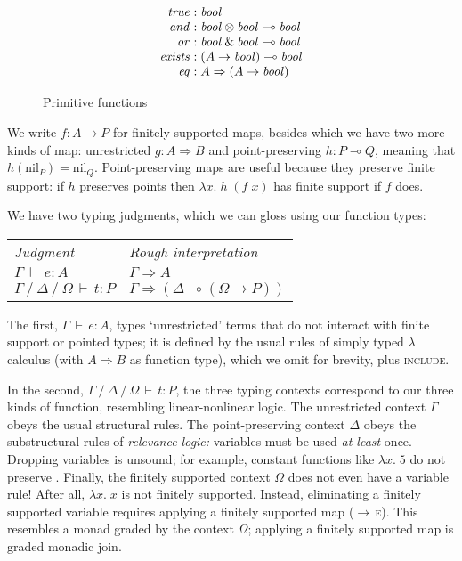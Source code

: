 \documentclass[sigplan,screen,dvipsnames,fleqn]{acmart}
\newcommand\name[1]{\ensuremath{\mathit{#1}}}
\newcommand\fnspace{\;}
\newcommand\fn[1]{\lambda{#1}.\fnspace}
\newcommand\<\;                 %
\newcommand\cto{\Rightarrow}    %
\newcommand\lto\multimap        %
\newcommand\fto{\rightarrow}    %
\newcommand\with{\mathbin{\&}}
\newcommand\ox\otimes
\newcommand\tbool{\name{bool}}
\newcommand\G\Gamma
\newcommand\D\Delta
\renewcommand\O\Omega
\newcommand\cxsep{\mathbin{/}}
\newcommand\cJ[3]{{#3} \,\vdash\, {#1} : {#2}}
\newcommand\J[5]{{#3} \cxsep {#4} \cxsep {#5} \,\vdash\, {#1} : {#2}}
\newcommand\cname\text          %
\newcommand\cnil{\cname{nil}}
\newcommand\tnil\cnil
\begin{document}
\begin{figure}
  \[\begin{array}{r@{\hskip 0.3em}l}
    \name{true} &: \tbool\\
    \name{and} &: \tbool \ox \tbool \lto \tbool\\
    \name{or} &: \tbool \with \tbool \lto \tbool\\
    \name{exists} &: (A \fto \tbool) \lto \tbool\\
    \name{eq} &: A \cto (A \fto \tbool)
  \end{array}\]\vspace{-1\baselineskip}
  \caption{Primitive functions}
  \label{fig-primitives}
\end{figure}

We write $f : A \fto P$ for finitely supported maps, besides which we have two more kinds of map: unrestricted $g : A \cto B$ and point-preserving $h : P \lto Q$, meaning that $h(\tnil_P) = \tnil_Q$.
%
Point-preserving maps are useful because they preserve finite support: if $h$ preserves points then $\fn x h \<(f \<x)$ has finite support if $f$ does.

We have two typing judgments, which we can gloss using our function types:

\begin{center}
  \begin{tabular}{l@{\hskip 2em}l}
    \em Judgment & \em Rough interpretation
    \\
    $\cJ e A \G$ & $\G \cto A$
    \\
    $\J t P \G \D \O$ & $\G \cto (\D \lto (\O \fto P))$
  \end{tabular}
\end{center}

\noindent
The first, $\cJ e A \G$, types `unrestricted' terms that do not interact with finite support or pointed types; it is defined by the usual rules of simply typed $\lambda$ calculus (with $A \cto B$ as function type), which we omit for brevity, plus \textsc{include}.

In the second, $\J t P \G \D \O$, the three typing contexts correspond to our three kinds of function, resembling linear-nonlinear logic.
%
The unrestricted context $\G$ obeys the usual structural rules.
%
The point-preserving context $\D$ obeys the substructural rules of \emph{relevance logic:} variables must be used \emph{at least} once.
Dropping variables is unsound; for example, constant functions like $\fn x 5$ do not preserve \tnil.
%
Finally, the finitely supported context $\O$ does not even have a variable rule! After all, $\fn x x$ is not finitely supported.
%
Instead, eliminating a finitely supported variable requires applying a finitely supported map (\textsc{$\fto\,$e}).
This resembles a monad graded by the context $\O$; applying a finitely supported map is graded monadic join.
\end{document}
